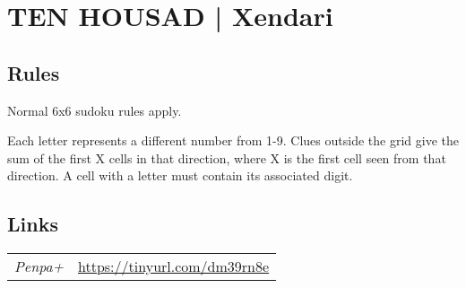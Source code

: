 \section[TEN HOUSAD | Xendari {[\emph{Sudoku, X-Sums, Cipher}]}]{TEN HOUSAD | {\normalfont Xendari}}
\label{sec:08-ten-housad-xendari}

\subsection*{Rules}
\begin{markdown}
Normal 6x6 sudoku rules apply.

Each letter represents a different number from 1-9. Clues outside the grid give the sum of the first X cells in that direction, where X is the first cell seen from that direction. A cell with a letter must contain its associated digit.
\end{markdown}
\subsection*{Links}
\begin{tabularx}{\textwidth}{l X}
\emph{Penpa+} & \url{https://tinyurl.com/dm39rn8e} \\
\end{tabularx}
\pagebreak
